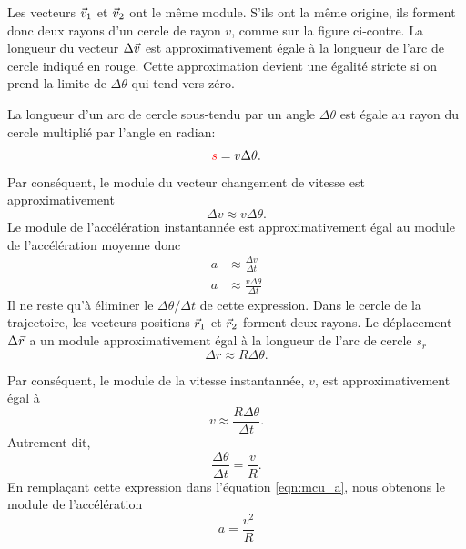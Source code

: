 Les vecteurs $\vec{v}_1$ et $\vec{v}_2$ ont le même module.  S'ils ont la même origine,
ils forment donc deux rayons d'un cercle de rayon $v$, comme sur la figure
ci-contre.  La longueur du vecteur $\Delta \vec{v}$ est approximativement égale à
la longueur de l'arc de cercle indiqué en rouge.  Cette approximation devient
une égalité stricte si on prend la limite de $\Delta \theta$ qui tend vers
zéro.
\begin{marginfigure}
\end{marginfigure}
La longueur d'un arc de cercle sous-tendu par un angle $\Delta \theta$ est
égale au rayon du cercle multiplié par l'angle en radian:
\[
  {\color{red}s} = v\Delta \theta.
\]
Par conséquent, le module du vecteur changement de vitesse est
approximativement
\[
  \Delta v \approx v\Delta\theta.
\]
Le module de l'accélération instantannée est approximativement égal au module
de l'accélération moyenne donc
\begin{align}
  a &\approx \frac{\Delta v}{\Delta t} \nonumber\\
  a &\approx \frac{v \Delta\theta}{\Delta t} \label{eqn:mcu_a} 
\end{align}
Il ne reste qu'à éliminer le $\Delta \theta / \Delta t$ de cette expression.
Dans le cercle de la trajectoire, les vecteurs positions $\vec{r}_1$ et $\vec{r}_2$
forment deux rayons.  Le déplacement $\Delta \vec{r}$ a un module approximativement
égal à la longueur de l'arc de cercle $s_r$
\[
  \Delta r \approx R \Delta \theta.
\]
\begin{marginfigure}
\end{marginfigure}
Par conséquent, le module de la vitesse instantannée, $v$, est
approximativement égal à
\[
  v \approx \frac{R\Delta \theta}{\Delta t}.
\]
Autrement dit,
\[
  \frac{\Delta \theta}{\Delta t} = \frac{v}{R}.
\]
En remplaçant cette expression dans l'équation \ref{eqn:mcu_a}, nous obtenons
le module de l'accélération
\[
  a = \frac{v^2}{R} 
\]

